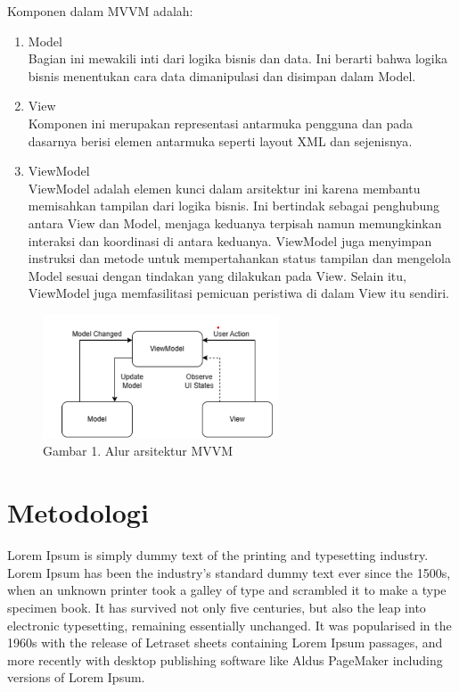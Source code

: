 \documentclass[conference]{IEEEtran}
\begin{document}
Komponen dalam MVVM adalah:
\begin{enumerate}
  \item Model \\
  Bagian ini mewakili inti dari logika bisnis dan data. Ini berarti bahwa logika bisnis menentukan cara data dimanipulasi dan disimpan dalam Model\cite{rasyid2022sistem}.
  
  \item View \\
  Komponen ini merupakan representasi antarmuka pengguna dan pada dasarnya berisi elemen antarmuka seperti layout XML dan sejenisnya\cite{rasyid2022sistem}.
  
  \item ViewModel \\
  ViewModel adalah elemen kunci dalam arsitektur ini karena membantu memisahkan tampilan dari logika bisnis. Ini bertindak sebagai penghubung antara View dan Model, menjaga keduanya terpisah namun memungkinkan interaksi dan koordinasi di antara keduanya. ViewModel juga menyimpan instruksi dan metode untuk mempertahankan status tampilan dan mengelola Model sesuai dengan tindakan yang dilakukan pada View. Selain itu, ViewModel juga memfasilitasi pemicuan peristiwa di dalam View itu sendiri\cite{rasyid2022sistem}.
\end{enumerate}


\begin{figure}[htp]
    \centering
    \includegraphics[width=7cm]{image/MVVM.png}
    \caption{Gambar 1. Alur arsitektur MVVM}
    \label{fig:mvi}
\end{figure}


\section{Metodologi}
Lorem Ipsum is simply dummy text of the printing and typesetting industry. Lorem Ipsum has been the industry's standard dummy text ever since the 1500s, when an unknown printer took a galley of type and scrambled it to make a type specimen book. It has survived not only five centuries, but also the leap into electronic typesetting, remaining essentially unchanged. It was popularised in the 1960s with the release of Letraset sheets containing Lorem Ipsum passages, and more recently with desktop publishing software like Aldus PageMaker including versions of Lorem Ipsum.




\vspace{12pt}
\end{document}
